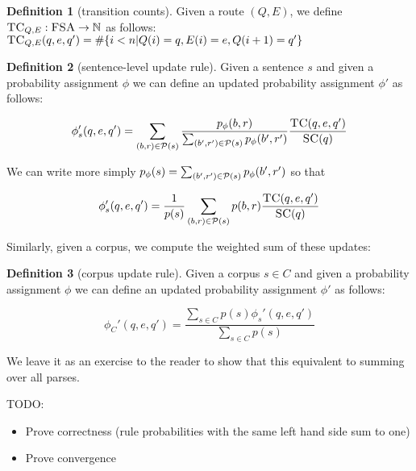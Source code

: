 \documentclass[12pt]{article}
\theoremstyle{definition}
\newtheorem{definition}{Definition}[section]
\begin{document}
\begin{definition}[transition counts]
  Given a route $(Q,E)$, we define $\textsc{TC}_{Q,E} : \textsc{FSA} \rightarrow\mathbb{N}$ as follows: $\textsc{TC}_{Q,E}(q,e,q') = \#\{ i<n | Q(i)=q,E(i)=e,Q({i+1})=q'\}$
\end{definition}


\begin{definition}[sentence-level update rule]
  Given a sentence $s$ and given a probability assignment $\phi$ we can define an updated probability assignment $\phi'$ as follows:

  $$\phi_s'(q,e,q') = \sum_{(b,r)\in\mathcal{P}(s)}\frac{p_\phi(b,r)}{\sum_{(b',r')\in\mathcal{P}(s)}p_\phi(b',r')}\frac{\textsc{TC}(q,e,q')}{\textsc{SC}(q)}$$
\end{definition}

We can write more simply $p_\phi(s)=\sum_{(b',r')\in\mathcal{P}(s)}p_\phi(b',r')$ so that

$$\phi_s'(q,e,q') = \frac{1}{p(s)}\sum_{(b,r)\in\mathcal{P}(s)}p(b,r)\frac{\textsc{TC}(q,e,q')}{\textsc{SC}(q)}$$


Similarly, given a corpus, we compute the weighted sum of these updates:
\begin{definition}[corpus update rule]
  Given a corpus $s\in C$ and given a probability assignment $\phi$ we can define an updated probability assignment $\phi'$ as follows:

  $$\phi_C'(q,e,q') = \frac{\sum_{s\in C}p(s)\phi_s'(q,e,q')}{\sum_{s\in C}p(s)}$$
\end{definition}

We leave it as an exercise to the reader to show that this equivalent to summing over all parses.


TODO:
\begin{itemize}
\item Prove correctness (rule probabilities with the same left hand side sum to one)
\item Prove convergence
\end{itemize}
\end{document}
